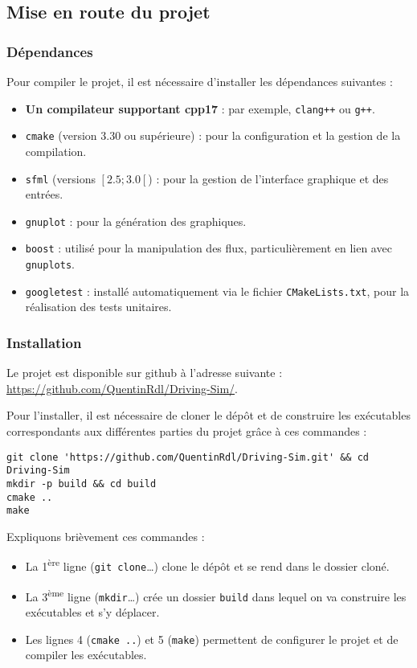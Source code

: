 \subsection{Mise en route du projet}\label{subsec:mise-en-route-du-projet}

\subsubsection{Dépendances}\label{subsubsec:dependances}
Pour compiler le projet, il est nécessaire d'installer les dépendances suivantes :
\begin{itemize}
    \item \textbf{Un compilateur supportant \gls{cpp}17} : par exemple, \texttt{clang++} ou \texttt{g++}.
    \item \texttt{\gls{cmake}} (version 3.30 ou supérieure) : pour la configuration et la gestion de la compilation.
    \item \texttt{\gls{sfml}} (versions $\left[2.5 ; 3.0\left[$) : pour la gestion de l'interface graphique et des entrées.
    \item \texttt{\gls{gnuplot}} : pour la génération des graphiques.
    \item \texttt{\gls{boost}} : utilisé pour la manipulation des flux, particulièrement en lien avec \texttt{\glspl{gnuplot}}.
    \item \texttt{\gls{googletest}} : installé automatiquement via le fichier \texttt{CMakeLists.txt}, pour la réalisation des tests unitaires.
\end{itemize}
\newpage
\subsubsection{Installation}\label{subsubsec:installation}
Le projet est disponible sur \gls{github} à l'adresse suivante : \url{https://github.com/QuentinRdl/Driving-Sim/}.

Pour l'installer, il est nécessaire de cloner le dépôt et de construire les exécutables correspondants aux différentes parties du projet grâce à ces commandes :

\begin{lstlisting}[style=bashStyle,label={lst:build}]
git clone 'https://github.com/QuentinRdl/Driving-Sim.git' && cd Driving-Sim
mkdir -p build && cd build
cmake ..
make
\end{lstlisting}
\noindent
Expliquons brièvement ces commandes :
\begin{itemize}
    \item La 1\textsuperscript{ère} ligne (\texttt{git clone}\dots) clone le dépôt et se rend dans le dossier cloné.
    \item La 3\textsuperscript{ème} ligne (\texttt{mkdir}\dots) crée un dossier \texttt{build} dans lequel on va construire les exécutables et s'y déplacer.
    \item Les lignes 4 (\texttt{cmake ..}) et 5 (\texttt{make}) permettent de configurer le projet et de compiler les exécutables.
\end{itemize}

